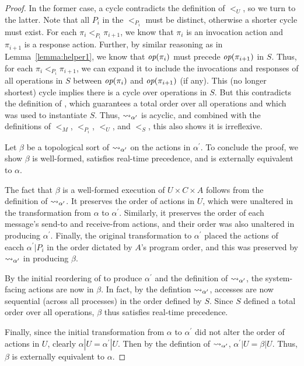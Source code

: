 \begin{proof}
  In the former case, a cycle contradicts the definition of $<_U$, so we turn to the latter.
  Note that all $P_i$ in the $<_{P_i}$ must be distinct, otherwise a shorter cycle must exist.
  For each $\pi_i <_{P_i} \pi_{i+1}$, we know that $\pi_i$ is an invocation action and
  $\pi_{i+1}$ is a response action. Further, by similar reasoning as in Lemma~\ref{lemma:helper1},
  we know that $\operatorname*{\textit{op}}(\pi_i)$ must precede $\operatorname*{\textit{op}}(\pi_{i+1})$ in $S$. Thus, for each $\pi_i <_{P_i} \pi_{i+1}$,
  we can expand it to include the invocations and responses of all operations in $S$ between $\operatorname*{\textit{op}}(\pi_i)$
  and $\operatorname*{\textit{op}}(\pi_{i+1})$ (if any). This (no longer shortest) cycle implies there is a cycle
  over operations in $S$. But this contradicts the definition of \MDL{}, which guarantees a total order
  over all operations and which was used to instantiate $S$. Thus, $\rightsquigarrow_{\alpha^\prime}$ is acyclic,
  and combined with the definitions of $<_M$, $<_{P_i}$, $<_U$, and $<_S$, this also shows
  it is irreflexive.

  Let $\beta$ be a topological sort of $\rightsquigarrow_{\alpha^\prime}$ on the actions in
  $\alpha^\prime$. To conclude the proof, we show $\beta$ is well-formed,
  satisfies \singledispatch{} real-time precedence, and is externally equivalent to $\alpha$.

  The fact that $\beta$ is a well-formed execution of $U \times C \times A$ follows
  from the definition of $\rightsquigarrow_{\alpha^\prime}$. It preserves the order of actions
  in $U$, which were unaltered in the transformation from $\alpha$ to $\alpha^\prime$.
  Similarly, it preserves the order of each message's send-to and receive-from actions,
  and their order was also unaltered in producing $\alpha^\prime$. Finally, the original
  transformation to $\alpha^\prime$ placed the actions of eacch $\alpha^\prime | P_i$ in
  the order dictated by $A$'s program order, and this was preserved by
  $\rightsquigarrow_{\alpha^\prime}$ in producing $\beta$.

  By the initial reordering of to produce $\alpha^\prime$ and the definition of
  $\rightsquigarrow_{\alpha^\prime}$, the system-facing actions are now \singledispatch{} in $\beta$.
  In fact, by the defintion $\rightsquigarrow_{\alpha^\prime}$, accesses are now sequential
  (across all processes) in the order defined by $S$. Since $S$ defined a total order over all
  operations, $\beta$ thus satisfies \singledispatch{} real-time precedence.

  Finally, since the initial transformation from $\alpha$ to $\alpha^\prime$ did not alter
  the order of actions in $U$, clearly $\alpha | U = \alpha^\prime | U$. Then by the defintion
  of $\rightsquigarrow_{\alpha^\prime}$, $\alpha^\prime | U = \beta | U$. Thus, $\beta$ is externally
  equivalent to $\alpha$.
\end{proof}